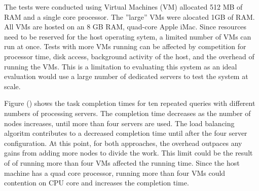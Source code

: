 \documentclass{article}
\newenvironment{Figure}
               {\par\medskip\noindent\minipage{\linewidth}}
               {\endminipage\par\medskip}
\begin{document}
\begin{multicols}{2}
\begin{Figure}
   \centering
\noindent{}
\end{Figure}


The tests were conducted using Virtual Machines (VM) allocated 512 MB of RAM and a single core processor. The ''large'' VMs were alocated 1GB of RAM.  All VMs are hosted on an 8 GB RAM, quad-core Apple iMac. Since resources need to be reserved for the host operating sytem, a limited number of VMs can run at once.  Tests with more VMs running can be affected by competition for processor time, disk access, background activity of the host, and the overhead of running the VMs.  This is a limitation to evaluating this system as an ideal evaluation would use a large number of dedicated servers to test the system at scale.

Figure () shows the task completion times for ten repeated queries with different numbers of processing servers.  The completion time decreases as the number of nodes increases, until more than four servers are used. The load balancing algoritm contributes to a decreased completion time until after the four server configuration.  At this point, for both approaches, the overhead outpaces any gains from adding more nodes to divide the work.  This limit could be the result of of running more than four VMs affected the running time.  Since the host machine has a quad core processor, running more than four VMs could contention on CPU core and increases the completion time.


\end{multicols}
\end{document}
